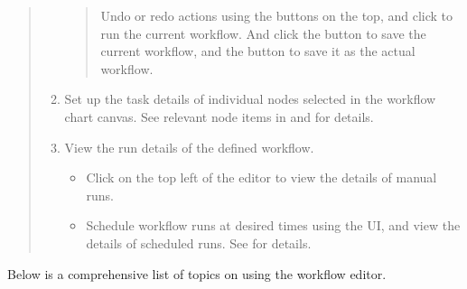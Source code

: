 \documentclass[letterpaper,10pt,english]{sphinxmanual}
\begin{document}
\begin{quote}
\begin{enumerate}
\begin{quote}
\begin{figure}[H]
\centering

\noindent{}
\end{figure}

Undo or redo actions using the  buttons on the top, and click  to run the current workflow. And click the  button to save the current workflow, and the  button to save it as the actual workflow.
\end{quote}

\item {} 
 Set up the task details of individual nodes selected in the workflow chart canvas. See relevant node items in {\hyperref[\detokenize{integrator/part03/tasks:action-nodes}]{}} and {\hyperref[\detokenize{integrator/part03/control_flow:control-flow-nodes}]{}} for details.

\item {} 
 View the run details of the defined workflow.
\begin{itemize}
\item {} 
 Click  on the top left of the editor to view the details of manual runs.

\item {} 
 Schedule workflow runs at desired times using the UI, and view the details of scheduled runs. See {\hyperref[\detokenize{integrator/part03/scheduled_run:scheduled-run}]{}} for details.

\end{itemize}

\end{enumerate}
\end{quote}

Below is a comprehensive list of topics on using the workflow editor.
\end{document}
